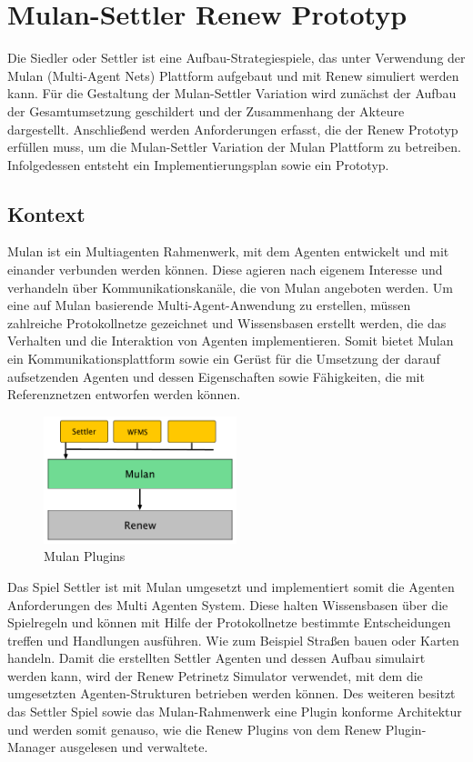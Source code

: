 \chapter{Mulan-Settler Renew Prototyp} \label{cha:mulan_settler}
	Die Siedler oder Settler ist eine Aufbau-Strategiespiele, das unter Verwendung der Mulan (Multi-Agent Nets) Plattform aufgebaut und mit Renew simuliert werden kann. \bigbreak
	Für die Gestaltung der Mulan-Settler Variation wird zunächst der Aufbau der Gesamtumsetzung geschildert und der Zusammenhang der Akteure dargestellt. Anschließend werden Anforderungen erfasst, die der Renew Prototyp erfüllen muss, um die Mulan-Settler Variation der Mulan Plattform zu betreiben. Infolgedessen entsteht ein Implementierungsplan sowie ein Prototyp.

\section{Kontext}
	Mulan \cite{Roelke04} ist ein Multiagenten Rahmenwerk, mit dem Agenten entwickelt und mit einander verbunden werden können. Diese agieren nach eigenem Interesse und verhandeln über Kommunikationskanäle, die von Mulan angeboten werden. Um eine auf Mulan basierende Multi-Agent-Anwendung zu erstellen, müssen zahlreiche Protokollnetze gezeichnet und Wissensbasen erstellt werden, die das Verhalten und die Interaktion von Agenten implementieren. Somit bietet Mulan ein Kommunikationsplattform sowie ein Gerüst für die Umsetzung der darauf aufsetzenden Agenten und dessen Eigenschaften sowie Fähigkeiten, die mit Referenznetzen entworfen werden können. \cite{cabac} \bigbreak
	\begin{figure}[h!]
	  \centering
	  \includegraphics[width=0.5\textwidth]{material/images/settler-mulan-renew.pdf}
	  \caption{Mulan Plugins}
	  \label{fig:mulan_plugin}
	\end{figure}
	Das Spiel Settler ist mit Mulan umgesetzt und implementiert somit die Agenten Anforderungen des Multi Agenten System. Diese halten Wissensbasen über die Spielregeln und können mit Hilfe der Protokollnetze bestimmte Entscheidungen treffen und Handlungen ausführen. Wie zum Beispiel Straßen bauen oder Karten handeln.\newline
	Damit die erstellten Settler Agenten und dessen Aufbau simulairt werden kann, wird der Renew Petrinetz Simulator verwendet, mit dem die umgesetzten Agenten-Strukturen betrieben werden können.\newline
	Des weiteren besitzt das Settler Spiel sowie das Mulan-Rahmenwerk eine Plugin konforme Architektur und werden somit genauso, wie die Renew Plugins von dem Renew Plugin-Manager ausgelesen und verwaltete.\bigbreak

